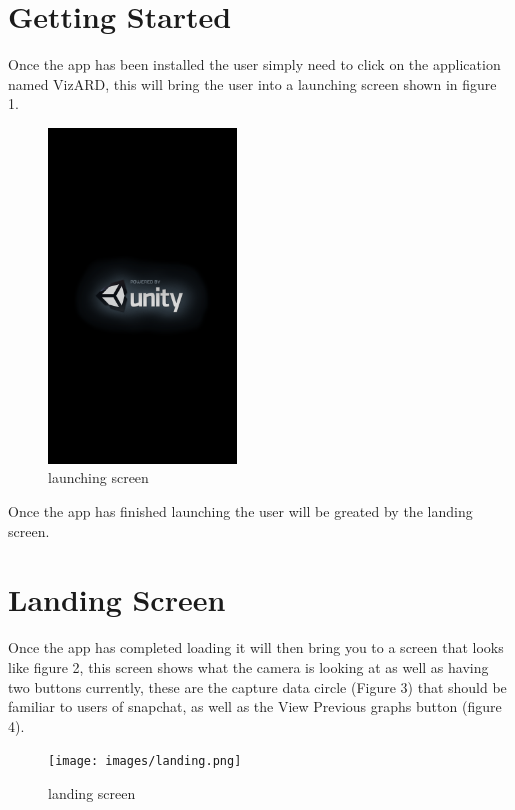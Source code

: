 \documentclass[a4paper,12pt]{article}
\begin{document}
\section{Getting Started}
Once the app has been installed the user simply need to click on the application named VizARD, this will bring the user into a launching screen shown in figure 1.\\
\begin{figure}[H]
\centering
	\includegraphics[width=50mm]{images/launch.png}
	\caption{launching screen \label{overflow}}
\end{figure}

Once the app has finished launching the user will be greated by the landing screen.
\section{Landing Screen}
Once the app has completed loading it will then bring you to a screen that looks like figure 2, this screen shows what the camera is looking at as well as having two buttons currently, these are the capture data circle (Figure 3) that should be familiar to users of snapchat, as well as the View Previous graphs button (figure 4).

\begin{figure}[H]
\centering
	\texttt{[image: images/landing.png]}
	\caption{landing screen \label{overflow}}
\end{figure}
\end{document}
